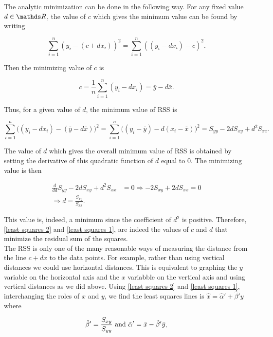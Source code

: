 \documentclass{homework}
\begin{document}
The analytic minimization can be done in the following way. For any fixed value $d \in \R$, the value of $c$ which gives the minimum value can be found by writing 

$$
\sum_{i=1}^{n} (y_i - (c+dx_i))^2 = \sum_{i=1}^{n} ((y_i - dx_i) -c)^2.
$$

Then the minimizing value of $c$ is 

\begin{equation}
    c = \frac{1}{n} \sum_{i=1}^{n} (y_i - dx_i) = \bar{y} - d \bar{x}.
    \label{least squares 2}
\end{equation}

Thus, for a given value of $d$, the minimum value of RSS is 

\begin{equation}
    \sum_{i=1}^{n} \bigg((y_i - dx_i) - (\bar{y} - d \bar{x})\bigg)^2 = \sum_{i=1}^{n} \bigg((y_i - \bar{y}) - d(x_i - \bar{x})\bigg)^2 = S_{yy} - 2dS_{xy} + d^2 S_{xx}.
\end{equation}

The value of $d$ which gives the overall minimum value of RSS is obtained by setting the derivative of this quadratic function of $d$ equal to $0$. The minimizing value is then 

\begin{align}
    \frac{d}{d d}  S_{yy} - 2dS_{xy} + d^2 S_{xx} &= 0 \Rightarrow -2 S_{xy} + 2d S_{xx} = 0 \\
    \Rightarrow d = \frac{S_{xy}}{S_{xx}}.
    \label{least squares 1}
\end{align}

This value is, indeed, a minimum since the coefficient of $d^2$ is positive. Therefore, \eqref{least squares 2} and \eqref{least squares 1}, are indeed the values of $c$ and $d$ that minimize the residual sum of the squares. \\

The RSS is only one of the many reasonable ways of measuring the distance from the line $c+dx$ to the data points. For example, rather than using vertical distances we could use horizontal distances. This is equivalent to graphing the $y$ variable on the horizontal axis and the $x$ variabble on the vertical axis and using vertical distances as we did above. Using \eqref{least squares 2} and \eqref{least squares 1}, interchanging the roles of $x$ and $y$, we find the least squares lines is $\hat{x} = \hat{\alpha}' + \hat{\beta}'y$ where 

\begin{align*}
   \hat{\beta}' = \frac{S_{xy}}{S_{yy}} \textnormal{ and } \hat{\alpha}' = \bar{x} - \hat{\beta}'\bar{y},
\end{align*}
\end{document}
